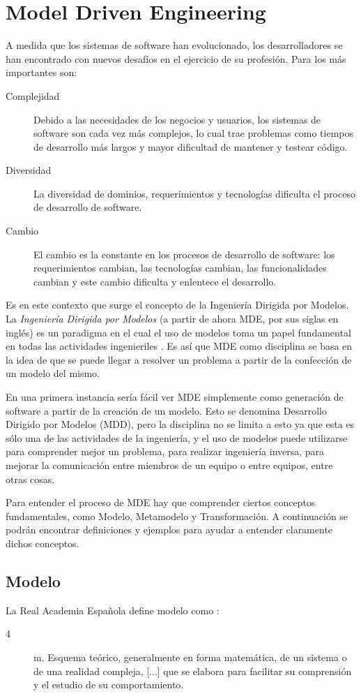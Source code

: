 \section{Model Driven Engineering}
A medida que los sistemas de software han evolucionado, los desarrolladores se han encontrado con nuevos desafíos en el ejercicio de su profesión. Para \cite{clark2015applied} los más importantes son:
\begin{description}
\item[Complejidad] Debido a las necesidades de los negocios y usuarios, los sistemas de software son cada vez más complejos, lo cual trae problemas como tiempos de desarrollo más largos y mayor dificultad de mantener y testear código.
\item[Diversidad] La diversidad de dominios, requerimientos y tecnologías dificulta el proceso de desarrollo de software.
\item[Cambio] El cambio es la constante en los procesos de desarrollo de software: los requerimientos cambian, las tecnologías cambian, las funcionalidades cambian y este cambio dificulta y enlentece el desarrollo.
\end{description}

Es en este contexto que surge el concepto de la Ingeniería Dirigida por Modelos.
La \textit{Ingeniería Dirigida por Modelos} (a partir de ahora MDE, por sus siglas en inglés) es un paradigma en el cual el uso de modelos toma un papel fundamental en todas las actividades ingenieriles \cite{kent2002model}. 
Es así que MDE como disciplina se basa en la idea de que se puede llegar a resolver un problema a partir de la confección de un modelo del mismo.

En una primera instancia sería fácil ver MDE simplemente como generación de software a partir de la creación de un modelo. Esto se denomina Desarrollo Dirigido por Modelos (MDD), pero la disciplina no se limita a esto ya que esta es sólo una de las actividades de la ingeniería, y el uso de modelos puede utilizarse para comprender mejor un problema, para realizar ingeniería inversa, para mejorar la comunicación entre miembros de un equipo o entre equipos, entre otras cosas.

Para entender el proceso de MDE hay que comprender ciertos conceptos fundamentales, como Modelo, Metamodelo y Transformación. A continuación se podrán encontrar definiciones y ejemplos para ayudar a entender claramente dichos conceptos.

\subsection{Modelo}
La Real Academia Española define modelo como \cite{rae2017modelo}:
\begin{description}
\item[4] m. Esquema teórico, generalmente en forma matemática, de un sistema o de una realidad compleja, [...] que se elabora para facilitar su comprensión y el estudio de su comportamiento.
\end{description}

